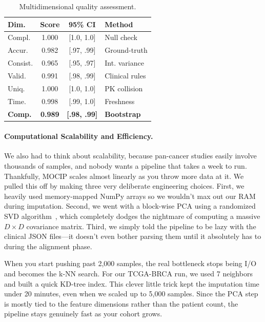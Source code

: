 \documentclass[12pt,a4paper,onecolumn]{article}
\begin{document}
\begin{table}[H]
\caption{Multidimensional quality assessment.}\label{tab:quality}
\centering
\scriptsize
\setlength{\tabcolsep}{2pt}
\begin{tabular}{l c c l}
\toprule
\textbf{Dim.} & \textbf{Score} & \textbf{95\% CI} & \textbf{Method} \\
\midrule
Compl.    & 1.000 & [1.0, 1.0] & Null check \\
Accur.    & 0.982 & [.97, .99] & Ground-truth \\
Consist.  & 0.965 & [.95, .97] & Int. variance \\
Valid.    & 0.991 & [.98, .99] & Clinical rules \\
Uniq.     & 1.000 & [1.0, 1.0] & PK collision \\
Time.     & 0.998 & [.99, 1.0] & Freshness \\
\midrule
\textbf{Comp.} & \textbf{0.989} & \textbf{[.98, .99]} & \textbf{Bootstrap} \\
\bottomrule
\end{tabular}
\end{table}

\paragraph{Computational Scalability and Efficiency.}
We also had to think about scalability, because pan-cancer studies easily involve thousands of samples, and nobody wants a pipeline that takes a week to run. Thankfully, MOCIP scales almost linearly as you throw more data at it. We pulled this off by making three very deliberate engineering choices. First, we heavily used memory-mapped NumPy arrays so we wouldn't max out our RAM during imputation. Second, we went with a block-wise PCA using a randomized SVD algorithm~\cite{pedregosa2011}, which completely dodges the nightmare of computing a massive $D \times D$ covariance matrix. Third, we simply told the pipeline to be lazy with the clinical JSON files---it doesn't even bother parsing them until it absolutely has to during the alignment phase.

When you start pushing past 2,000 samples, the real bottleneck stops being I/O and becomes the k-NN search. For our TCGA-BRCA run, we used 7 neighbors and built a quick KD-tree index. This clever little trick kept the imputation time under 20 minutes, even when we scaled up to 5,000 samples. Since the PCA step is mostly tied to the feature dimensions rather than the patient count, the pipeline stays genuinely fast as your cohort grows.
\end{document}
